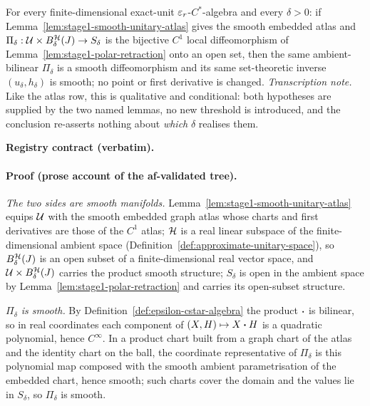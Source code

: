 \begin{lemma}\label{lem:stage1-smooth-polar-inverse}
For every finite-dimensional exact-unit $\varepsilon_r$-$C^*$-algebra and every $\delta>0$: if
Lemma~\ref{lem:stage1-smooth-unitary-atlas} gives the smooth embedded atlas and
$\Pi_\delta:\mathcal U\times B^{\mathcal H}_{\delta}(J)\to S_\delta$ is the bijective $C^{1}$ local
diffeomorphism of Lemma~\ref{lem:stage1-polar-retraction} onto an open set, then the same
ambient-bilinear $\Pi_\delta$ is a smooth diffeomorphism and its same set-theoretic inverse
$(u_\delta,h_\delta)$ is smooth; no point or first derivative is changed.
\emph{Transcription note.} Like the atlas row, this is qualitative and conditional: both
hypotheses are supplied by the two named lemmas, no new threshold is introduced, and the
conclusion re-asserts nothing about \emph{which} $\delta$ realises them.
\end{lemma}

\noindent\textbf{Registry contract (verbatim).}

\paragraph{Proof (prose account of the af-validated tree).}
\emph{The two sides are smooth manifolds.} Lemma~\ref{lem:stage1-smooth-unitary-atlas}
equips $\mathcal U$ with the smooth embedded graph atlas whose charts and first derivatives are
those of the $C^{1}$ atlas; $\mathcal H$ is a real linear subspace of the finite-dimensional
ambient space (Definition~\ref{def:approximate-unitary-space}), so $B^{\mathcal H}_{\delta}(J)$
is an open subset of a finite-dimensional real vector space, and
$\mathcal U\times B^{\mathcal H}_{\delta}(J)$ carries the product smooth structure; $S_\delta$ is
open in the ambient space by Lemma~\ref{lem:stage1-polar-retraction} and carries its
open-subset structure.

\emph{$\Pi_\delta$ is smooth.} By Definition~\ref{def:epsilon-cstar-algebra} the product
$\mathbin{\bm{\cdot}}$ is bilinear, so in real coordinates each component of $(X,H)\mapsto X\mathbin{\bm{\cdot}} H$ is a
quadratic polynomial, hence $C^{\infty}$. In a product chart built from a graph chart of
the atlas and the identity chart on the ball, the coordinate representative of
$\Pi_\delta$ is this polynomial map composed with the smooth ambient parametrisation of
the embedded chart, hence smooth; such charts cover the domain and the values lie in
$S_\delta$, so $\Pi_\delta$ is smooth.

